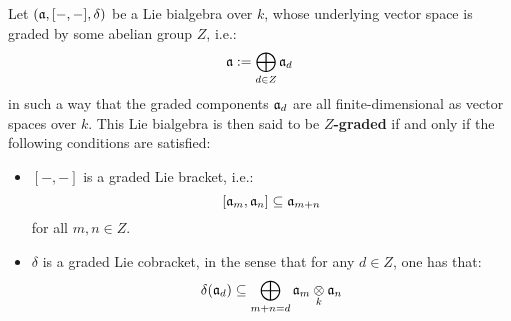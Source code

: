         \begin{definition} \label{def: graded_lie_bialgberas}
            Let $(\mathfrak{a}, [-, -], \delta)$ be a Lie bialgebra over $k$, whose underlying vector space is graded by some abelian group $Z$, i.e.:
                $$\mathfrak{a} := \bigoplus_{d \in Z} \mathfrak{a}_d$$
            in such a way that the graded components $\mathfrak{a}_d$ are all finite-dimensional as vector spaces over $k$. This Lie bialgebra is then said to be \textbf{$Z$-graded} if and only if the following conditions are satisfied:
            \begin{itemize}
                \item $[-, -]$ is a graded Lie bracket, i.e.:
                    $$[\mathfrak{a}_m, \mathfrak{a}_n] \subseteq \mathfrak{a}_{m + n}$$
                for all $m, n \in Z$.
                \item $\delta$ is a graded Lie cobracket, in the sense that for any $d \in Z$, one has that:
                    $$\delta(\a_d) \subseteq \bigoplus_{m + n = d} \a_m \tensor_k \a_n$$
            \end{itemize}
        \end{definition}
